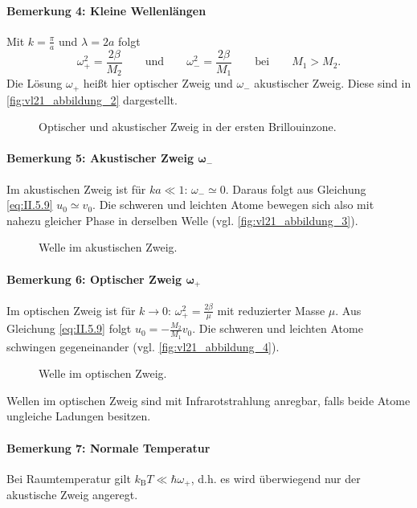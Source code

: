 \paragraph{Bemerkung 4: Kleine Wellenlängen}
	Mit $k=\frac{\pi}{a}$ und $\lambda = 2a$ folgt
	$$
	\omega_{+}^2 = \frac{2\beta}{M_2}\qquad\text{und}\qquad \omega_{-}^2 = \frac{2\beta}{M_1}\qquad\text{bei} \qquad M_1>M_2.
	$$
	Die Lösung $\omega_+$ heißt hier optischer Zweig und $\omega_-$ akustischer Zweig. 
	Diese sind in \autoref{fig:vl21_abbildung_2} dargestellt.
	\begin{figure}[H]
		\centering
		\caption{Optischer und akustischer Zweig in der ersten Brillouinzone.}
		\label{fig:vl21_abbildung_2}
	\end{figure}
	
\paragraph{Bemerkung 5: Akustischer Zweig $\bm\omega_-$}
	Im akustischen Zweig ist für $ka\ll 1$: $\omega_{-}\simeq 0$.
	Daraus folgt aus Gleichung \eqref{eq:II.5.9} $u_0 \simeq v_0$.
	Die schweren und leichten Atome bewegen sich also mit nahezu gleicher Phase in derselben Welle (vgl. \autoref{fig:vl21_abbildung_3}).
	\begin{figure}[H]
		\centering
		\caption{Welle im akustischen Zweig.}
		\label{fig:vl21_abbildung_3}
	\end{figure}

\paragraph{Bemerkung 6: Optischer Zweig $\bm\omega_+$}
	Im optischen Zweig ist für $k\to 0$: $\omega_{+}^2 = \frac{2\beta}{\mu}$ mit reduzierter Masse $\mu$. 
	Aus Gleichung \eqref{eq:II.5.9} folgt $u_0 = - \frac{M_2}{M_1} v_0$.
	Die schweren und leichten Atome schwingen gegeneinander (vgl. \autoref{fig:vl21_abbildung_4}).
	\begin{figure}[H]
		\centering
		\caption{Welle im optischen Zweig.}
		\label{fig:vl21_abbildung_4}
	\end{figure}
	Wellen im optischen Zweig sind mit Infrarotstrahlung anregbar, falls beide Atome ungleiche Ladungen besitzen.

\paragraph{Bemerkung 7: Normale Temperatur}
	Bei Raumtemperatur gilt $k_{\mathrm{B}}T\ll \hbar \omega_{+}$, d.h. es wird überwiegend nur der akustische Zweig angeregt.


